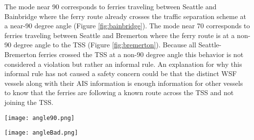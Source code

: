 \documentclass[twoside,symmetric,notoc]{tufte-book}
\begin{document}
\par{
The mode near 90 corresponds to ferries traveling between Seattle and Bainbridge where the ferry route already crosses the traffic separation scheme at a near-90 degree angle (Figure \ref{fig:bainbridge}). The mode near 70 corresponds to ferries traveling between Seattle and Bremerton where the ferry route is at a non-90 degree angle to the TSS (Figure \ref{fig:bremerton}). Because all Seattle-Bremerton ferries crossed the TSS at a non-90 degree angle this behavior is not considered a violation but rather an informal rule. An explanation for why this informal rule has not caused a safety concern could be that the distinct WSF vessels along with their AIS information is enough information for other vessels to know that the ferries are following a known route across the TSS and not joining the TSS. 
\begin{figure*}
    \centering
    \texttt{[image: angle90.png]}
    \caption{Example Seattle-Bainbridge ferry route that crosses the TSS at a relative 90 degree angle.}
    \label{fig:bainbridge}
\end{figure*}
\begin{figure*}
    \centering
    \texttt{[image: angleBad.png]}
    \caption{Example Seattle-Bremerton ferry route that crosses the TSS at a relative non-90 degree angle.}
    \label{fig:bremerton}
\end{figure*}

}
\newpage
\end{document}
